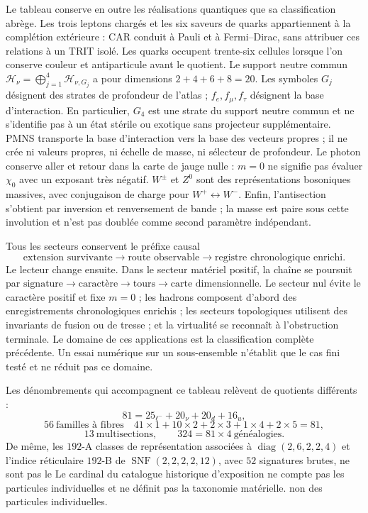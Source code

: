 
Le tableau conserve en outre les réalisations quantiques que sa classification
abrège. Les trois leptons chargés et les six saveurs de quarks appartiennent à la
complétion extérieure : CAR conduit à Pauli et à Fermi--Dirac, sans attribuer ces
relations à un TRIT isolé. Les quarks occupent trente-six cellules lorsque l'on
conserve couleur et antiparticule avant le quotient. Le support neutre commun
\(\mathcal H_\nu=\bigoplus_{j=1}^{4}\mathcal H_{\nu,G_j}\) a pour dimensions
\(2+4+6+8=20\). Les symboles \(G_j\) désignent des strates de profondeur de l'atlas ;
\(f_e,f_\mu,f_\tau\) désignent la base d'interaction. En particulier, \(G_4\) est
une strate du support neutre commun et ne s'identifie pas à un état stérile ou
exotique sans projecteur supplémentaire. PMNS transporte la base d'interaction vers la
base des vecteurs propres ; il ne crée ni valeurs propres, ni échelle de masse, ni sélecteur de
profondeur. Le photon conserve aller et retour dans la
carte de jauge nulle : \(m=0\) ne signifie pas évaluer \(\chi_0\) avec un exposant très
négatif. \(W^\pm\) et \(Z^0\) sont des représentations bosoniques massives, avec
conjugaison de charge pour \(W^+\leftrightarrow W^-\). Enfin,
l'antisection s'obtient par inversion et renversement de bande ; la masse est paire
sous cette involution et n'est pas doublée comme second paramètre indépendant.

Tous les secteurs conservent le préfixe causal
\[
\text{extension survivante}\longrightarrow\text{route observable}
\longrightarrow\text{registre chronologique enrichi}.
\]
Le lecteur change ensuite. Dans le secteur matériel positif, la chaîne se poursuit par
\(\text{signature}\to\text{caractère}\to\text{tours}\to\text{carte dimensionnelle}\).
Le secteur nul évite le caractère positif et fixe \(m=0\) ; les hadrons composent
d'abord des enregistrements chronologiques enrichis ; les secteurs topologiques utilisent des invariants de
fusion ou de tresse ; et la virtualité se reconnaît à l'obstruction terminale. Le
domaine de ces applications est la classification complète précédente. Un essai
numérique sur un sous-ensemble n'établit que le cas fini testé et ne
réduit pas ce domaine.

Les dénombrements qui accompagnent ce tableau relèvent de quotients différents :
\[
81=25_{\ell^-}+20_\nu+20_d+16_u,
\]
\[
56\ \text{familles à fibres}\quad
41\times1+10\times2+2\times3+1\times4+2\times5=81,
\]
\[
13\ \text{multisections},\qquad324=81\times4\ \text{généalogies}.
\]
De même, les \(192\)-A classes de représentation associées à
\(\operatorname{diag}(2,6,2,2,4)\) et l'indice réticulaire \(192\)-B de
\(\operatorname{SNF}(2,2,2,2,12)\), avec \(52\) signatures brutes, ne sont pas le
Le cardinal du catalogue historique d'exposition ne compte pas les particules individuelles et ne définit pas la taxonomie matérielle.
non des particules individuelles.
